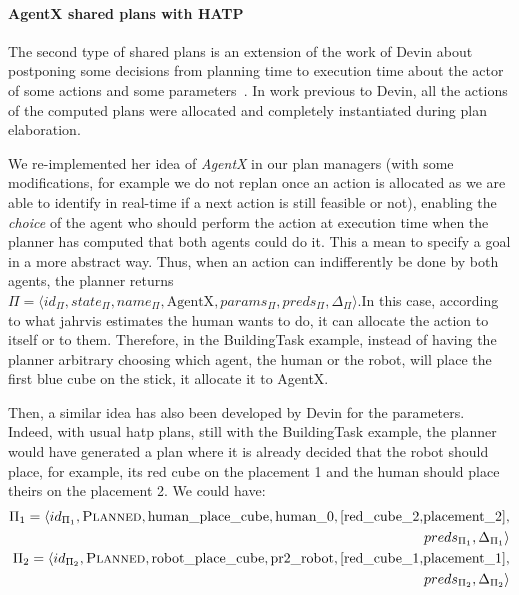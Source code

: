 \documentclass[a4paper,11pt,twoside]{StyleThese}
\begin{document}
\paragraph{AgentX shared plans with HATP}
The second type of shared plans is an extension of the work of Devin about postponing some decisions from planning time to execution time about the actor of some actions and some parameters~\cite{devin_2017_decisions}. In work previous to Devin, all the actions of the computed plans were allocated and completely instantiated during plan elaboration. 

We re-implemented her idea of \emph{AgentX} in our plan managers (with some modifications, for example we do not replan once an action is allocated as we are able to identify in real-time if a next action is still feasible or not), enabling the \emph{choice} of the agent who should perform the action at execution time when the planner has computed that both agents could do it. This a mean to specify a goal in a more abstract way. Thus, when an action can indifferently be done by both agents, the planner returns  $\Pi=\langle id_\Pi,state_\Pi,name_\Pi,\text{AgentX},params_\Pi,preds_\Pi,\Delta_\Pi\rangle$.In this case, according to what \acrshort{jahrvis} estimates the human wants to do, it can allocate the action to itself or to them. Therefore, in the BuildingTask example, instead of having the planner arbitrary choosing which agent, the human or the robot, will place the first blue cube on the stick, it allocate it to AgentX.
\thispagestyle{example}

Then, a similar idea has also been developed by Devin for the parameters. Indeed, with usual \acrshort{hatp} plans, still with the BuildingTask example, the planner would have generated a plan where it is already decided that the robot should place, for example, its red cube on the placement 1 and the human should place theirs on the placement 2. We could have:
\begin{align*}
	\Pi_1=\langle id_{\Pi_1},\textsc{Planned},\text{human\_place\_cube},\text{human\_0}, [\text{red\_cube\_2,placement\_2}],&\\ preds_{\Pi_1},\Delta_{\Pi_1}\rangle&\\
	\Pi_2=\langle id_{\Pi_2},\textsc{Planned},\text{robot\_place\_cube},\text{pr2\_robot}, [\text{red\_cube\_1,placement\_1}],&\\ preds_{\Pi_2},\Delta_{\Pi_2}\rangle&
\end{align*}
  
\end{document}

